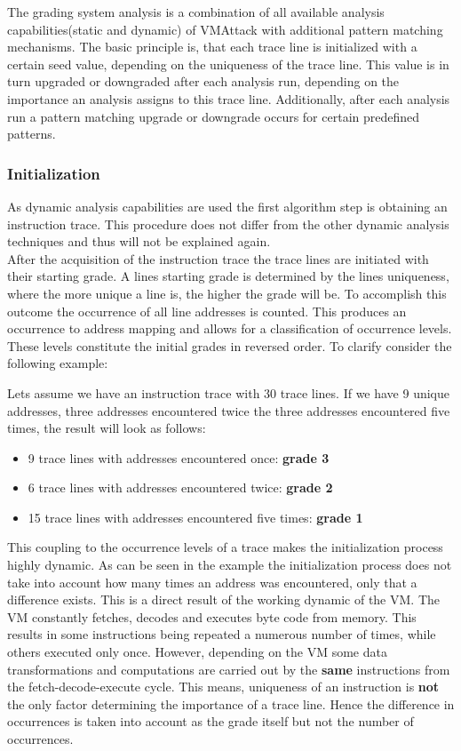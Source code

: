 \documentclass[10pt,twoside,a4paper,bibliography=totoc]{scrbook}
\begin{document}
The grading system analysis is a combination of all available analysis capabilities(static and dynamic) of VMAttack with additional pattern matching mechanisms. The basic principle is, that each trace line is initialized with a certain seed value, depending on the uniqueness of the trace line. 
This value is in turn upgraded or downgraded after each analysis run, depending on the importance an analysis assigns to this trace line. 
Additionally, after each analysis run a pattern matching upgrade or downgrade occurs for certain predefined patterns.

\subsubsection{Initialization}
As dynamic analysis capabilities are used the first algorithm step is obtaining an instruction trace. This procedure does not differ from the other dynamic analysis techniques and thus will not be explained again. \\
After the acquisition of the instruction trace the trace lines are initiated with their starting grade.
A lines starting grade is determined by the lines uniqueness, where the more unique a line is, the higher the grade will be. To accomplish this outcome the occurrence of all line addresses is counted. This produces an occurrence to address mapping and allows for a classification of occurrence levels.
These levels constitute the initial grades in reversed order. To clarify consider the following example:

Lets assume we have an instruction trace with 30 trace lines. If we have 9 unique addresses, three addresses encountered twice the three addresses encountered five times, the result will look as follows:
\begin{itemize}
\item{9 trace lines with addresses encountered once: \textbf{grade 3}}
\item{6 trace lines with addresses encountered twice: \textbf{grade 2}}
\item{15 trace lines with addresses encountered five times: \textbf{grade 1}}
\end{itemize}

This coupling to the occurrence levels of a trace makes the initialization process highly dynamic. As can be seen in the example the initialization process does not take into account how many times an address was encountered, only that a difference exists.
This is a direct result of the working dynamic of the VM. The VM constantly fetches, decodes and executes byte code from memory. This results in some instructions being repeated a numerous number of times, while others executed only once. 
However, depending on the VM some data transformations and computations are carried out by the \textbf{same} instructions from the fetch-decode-execute cycle. This means, uniqueness of an instruction is \textbf{not} the only factor determining the importance of a trace line. 
Hence the difference in occurrences is taken into account as the grade itself but not the number of occurrences.
\end{document}
